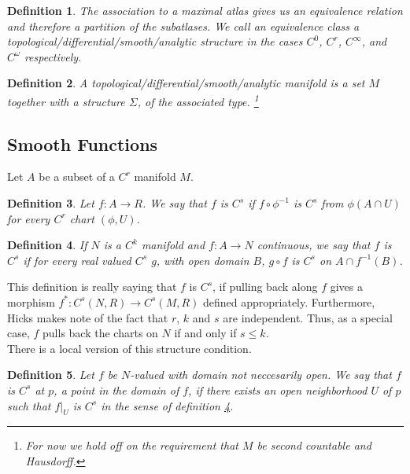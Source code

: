 \documentclass{article}
\theoremstyle{problemstyle}
\theoremstyle{problemstyle}
\theoremstyle{problemstyle}
\newtheorem{definition}{Definition}
\theoremstyle{problemstyle}
\theoremstyle{problemstyle}
\theoremstyle{problemstyle}
\begin{document}
\begin{definition}
The association to a maximal atlas gives us an equivalence relation and therefore a partition of the subatlases. We call an equivalence class a topological/differential/smooth/analytic structure in the cases $C^0$, $C^r$, $C^\infty$, and $C^\omega$ respectively.  
\end{definition}

\begin{definition}
A topological/differential/smooth/analytic manifold is a set $M$ together with a structure $\Sigma$, of the associated type. \footnote{For now we hold off on the requirement that $M$ be second countable and Hausdorff.}
\end{definition}

\subsection{Smooth Functions}

Let $A$ be a subset of a $C^r$ manifold $M$.

\begin{definition}
Let $f:A\rightarrow R$. We say that $f$ is $C^s$ if $f \circ \phi^{-1}$ is $C^s$ from $\phi(A \cap U)$ for every $C^r$ chart $(\phi, U)$. 
\end{definition}

\begin{definition}\label{C^s map of manifolds}
If $N$ is a $C^k$ manifold and $f:A \rightarrow N$ continuous, we say that $f$ is $C^s$ if for every real valued $C^s$ $g$, with open domain $B$, $g \circ f$ is $C^s$ on $A \cap f^{-1}(B)$. 
\end{definition}

This definition is really saying that $f$ is $C^s$, if pulling back along $f$ gives a morphism $f^*: C^s(N,R) \rightarrow C^s(M,R)$ defined appropriately. Furthermore, Hicks makes note of the fact that $r$, $k$ and $s$ are independent. Thus, as a special case, $f$ pulls back the charts on $N$ if and only if $s \leq k$.\\

There is a local version of this structure condition. 

\begin{definition}\label{restriction C^s}
Let $f$ be $N$-valued with domain not neccesarily open. We say that $f$ is $C^s$ at $p$, a point in the domain of $f$, if there exists an open neighborhood $U$ of $p$ such that $f|_{U}$ is $C^s$ in the sense of definition \ref{C^s map of manifolds}. 
\end{definition}
\end{document}
